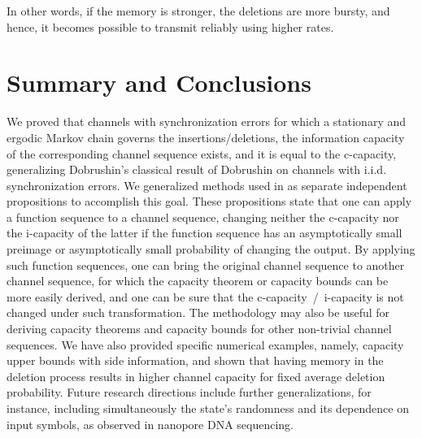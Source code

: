 \documentclass[journal, twocol]{IEEEtran}
\begin{document}
In other words, if the memory is stronger, the deletions are more bursty, and hence, it becomes possible to transmit reliably using higher rates. 

\section{Summary and Conclusions}
\label{s:conc}
We proved that channels with synchronization errors for which a stationary and ergodic Markov chain governs the insertions/deletions, the information capacity of the corresponding channel sequence exists, and it is equal to the c-capacity, generalizing Dobrushin's classical result of Dobrushin on channels with i.i.d. synchronization errors. 
We generalized methods used in \cite{dobrushin59ageneral,dobrushin67shannons} as separate independent propositions to accomplish this goal. 
These propositions state that one can apply a function sequence to a channel sequence, changing neither the c-capacity nor the i-capacity of the latter if the function sequence has an asymptotically small preimage or asymptotically small probability of changing the output.
By applying such function sequences, one can bring the original channel sequence to another channel sequence, for which the capacity theorem or capacity bounds can be more easily derived, and one can be sure that the c-capacity~/~i-capacity is not changed under such transformation. 
The methodology may also be useful for deriving capacity theorems and capacity bounds for other non-trivial channel sequences.
We have also provided specific numerical examples, namely, capacity upper bounds with side information, and shown that having memory in the deletion process results in higher channel capacity for fixed average deletion probability.
Future research directions include further generalizations, for instance, including simultaneously the state's randomness and its dependence on input symbols, as observed in nanopore DNA sequencing.
\end{document}
